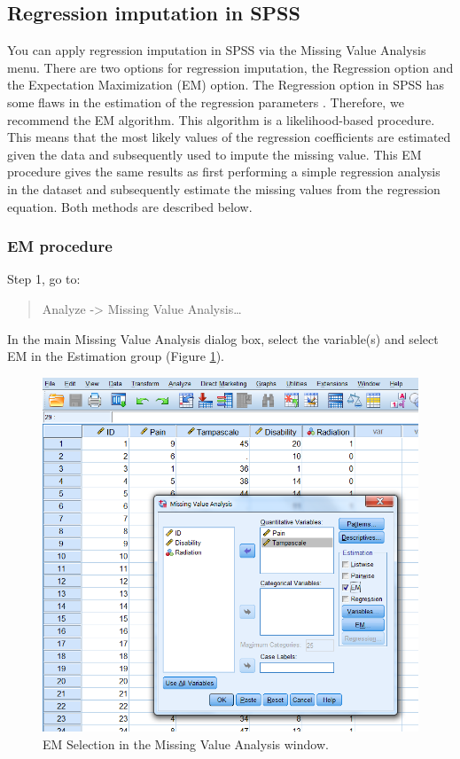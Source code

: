 \documentclass[
]{book}
\begin{document}
\hypertarget{regression-imputation-in-spss}{%
\subsection{Regression imputation in SPSS}\label{regression-imputation-in-spss}}

You can apply regression imputation in SPSS via the Missing Value Analysis menu. There are two options for regression imputation, the Regression option and the Expectation Maximization (EM) option. The Regression option in SPSS has some flaws in the estimation of the regression parameters \citep{hippel2004}. Therefore, we recommend the EM algorithm. This algorithm is a likelihood-based procedure. This means that the most likely values of the regression coefficients are estimated given the data and subsequently used to impute the missing value. This EM procedure gives the same results as first performing a simple regression analysis in the dataset and subsequently estimate the missing values from the regression equation. Both methods are described below.

\hypertarget{em-procedure}{%
\subsubsection{EM procedure}\label{em-procedure}}

Step 1, go to:

\begin{quote}
Analyze -\textgreater{} Missing Value Analysis\ldots{}
\end{quote}

In the main Missing Value Analysis dialog box, select the variable(s) and select EM in the Estimation group (Figure \ref{fig:fig3-10}).

\begin{figure}

{\centering \includegraphics[width=0.7\linewidth]{images/fig3.10} 

}

\caption{EM Selection in the Missing Value Analysis window.}\label{fig:fig3-10}
\end{figure}
\end{document}
